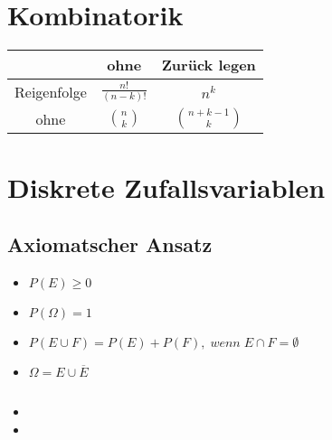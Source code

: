 \documentclass{article}
\begin{document}
\section{Kombinatorik}
\begin{tabular}{c| c |c}
  & ohne & Zurück legen \\ \hline
  Reigenfolge & $\frac{n!}{(n-k)!}$&$n^k$ \\
  ohne&${n \choose k}$ & ${n + k -1 \choose k}$ \\
  
\end{tabular}

\section{Diskrete Zufallsvariablen}
\subsection{Axiomatscher Ansatz}
\begin{itemize}
\item $P(E)\geq 0$
\item $P(\Omega) = 1$
\item $P(E\cup F) = P(E)+P(F), \; wenn\;  E\cap F = \emptyset $
\item $\Omega = E \cup \overline{E}$
\end{itemize}














\subsection{}
\begin{itemize}
\item
\item
\end{itemize}
\end{document}

